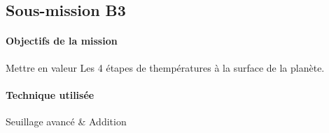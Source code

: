 \subsection{Sous-mission B3}

	\begin{vwcol}[widths={0.65,0.2}, rule=0pt]
	\begin{minipage}{0.7\textwidth}
	\paragraph{Objectifs de la mission}

	Mettre en valeur Les 4 étapes de thempératures à la surface de la planète. 
	\end{minipage}

	\begin{minipage}{0.25\textwidth}
	\begin{flushright}
	\paragraph{Technique utilisée}
	
	Seuillage avancé \& Addition
	\end{flushright}
	\end{minipage}

	\end{vwcol} 

